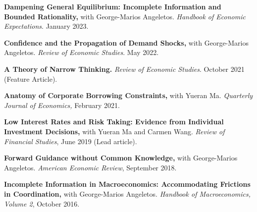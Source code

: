 \documentclass[line]{res}
\newenvironment{list1}{
  \begin{list}{\ding{113}}{%
      \setlength{\itemsep}{0.07in}
      \setlength{\parsep}{0in} \setlength{\parskip}{0in}
		\setlength{\topsep}{0.07in} \setlength{\partopsep}{0in} 
      \setlength{\leftmargin}{0.0in}}}{\end{list}}
\begin{document}
\begin{resume}
\begin{list1}
\vspace{0.2cm}

\item[] \textbf{Dampening General Equilibrium: Incomplete Information and Bounded Rationality,} with George-Marios Angeletos. \emph{Handbook of Economic Expectations}. January 2023.

\vspace{0.2cm}

\item[] \textbf{Confidence and the Propagation of Demand Shocks,} with George-Marios Angeletos. \emph{Review of Economic Studies}. May 2022.
\vspace{0.2cm}

\item[] \textbf{A Theory of Narrow Thinking.}  \emph{Review of Economic Studies}. October 2021 (Feature Article).
\vspace{0.2cm}


\item[] \textbf{Anatomy of Corporate Borrowing Constraints,} with Yueran Ma. \emph{Quarterly Journal of Economics,} February 2021.
\vspace{0.2cm}
\item[] \textbf{Low Interest Rates and Risk Taking: Evidence from Individual Investment Decisions,} with Yueran Ma and Carmen Wang. \emph{Review of Financial Studies}, June 2019 (Lead article).
\vspace{0.2cm}

\item[] \textbf{Forward Guidance without Common Knowledge,} with George-Marios Angeletos. \emph{American Economic Review}, September 2018.
\vspace{0.2cm}

\item[]
\textbf{Incomplete Information in Macroeconomics: Accommodating Frictions in Coordination,} with George-Marios Angeletos. \emph{Handbook of Macroeconomics, Volume 2}, October 2016.

\end{list1}







\end{resume}
\end{document}
